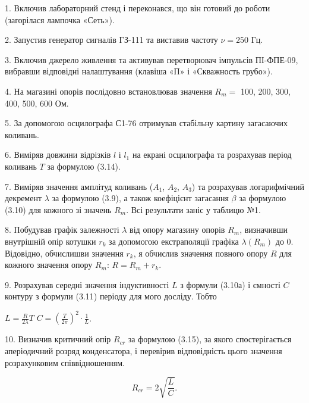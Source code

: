 \documentclass[12pt,a4paper]{article}
\begin{document}
    \setlength{\parindent}{1.5em}

    1. Включив лабораторний стенд і переконався, що він готовий до роботи (загорілася лампочка «Сеть»).

    2. Запустив генератор сигналів ГЗ-111 та виставив частоту $\nu = 250$ Гц.

    3. Включив джерело живлення та активував перетворювач імпульсів ПІ-ФПЕ-09, вибравши відповідні налаштування (клавіша «П» і «Скважность грубо»).

    4. На магазині опорів послідовно встановлював значення $R_m = $ 100, 200, 300, 400, 500, 600 Ом.

    5. За допомогою осцилографа С1-76 отримував стабільну картину загасаючих коливань.

    6. Виміряв довжини відрізків $l$ і $l_1$ на екрані осцилографа та розрахував період коливань $T$ за формулою (3.14).

    7. Виміряв значення амплітуд коливань ($A_1$, $A_2$, $A_3$) та розрахував логарифмічний декремент $\lambda$ за формулою (3.9), а також коефіцієнт загасання $\beta$ за формулою (3.10) для кожного зі значень $R_m$. Всі результати заніс у таблицю №1.

    8. Побудував графік залежності $\lambda$ від опору магазину опорів $R_m$, визначивши внутрішній опір котушки $r_k$ за допомогою екстраполяції графіка $\lambda(R_m)$ до 0. Відовідно, обчислишви значення $r_k$, я обчислив значення повного
    опору $R$ для кожного значення опору $R_m$: $R = R_m + r_k$.

    9. Розрахував середні значення індуктивності $L$ з формули (3.10а) і ємності $C$ контуру з формули (3.11) періоду для мого досліду. Тобто

    \begin{center}
        $\displaystyle L = \frac{R}{2\lambda} T$  $\displaystyle C = \left( \frac{T}{2\pi} \right)^2 \cdot \frac{1}{L}$.
    \end{center}

    10. Визначив критичний опір $R_{cr}$ за формулою (3.15), за якого спостерігається аперіодичний розряд конденсатора, і перевірив відповідність цього значення розрахунковим співвідношенням.

    \begin{equation}
        R_{cr} = 2 \sqrt{\frac{L}{C}}.
        \tag{3.15}
    \end{equation}

    \vspace{1em} %
\end{document}
